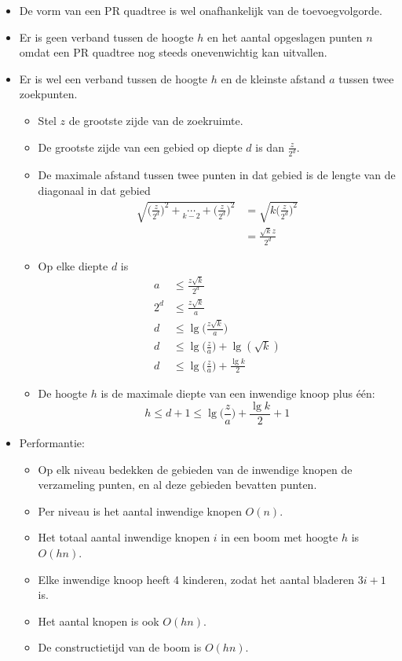 \begin{itemize}
\begin{itemize}
    \end{itemize}
    \item De vorm van een PR quadtree is wel onafhankelijk van de toevoegvolgorde.
    \item Er is geen verband tussen de hoogte $h$ en het aantal opgeslagen punten $n$ omdat een PR quadtree nog steeds onevenwichtig kan uitvallen.
    \item Er is wel een verband tussen de hoogte $h$ en de kleinste afstand $a$ tussen twee zoekpunten.
    \begin{itemize}
        \item Stel $z$ de grootste zijde van de zoekruimte.
        \item De grootste zijde van een gebied op diepte $d$ is dan $\frac{z}{2^d}$. 
        \item De maximale afstand tussen twee punten in dat gebied is de lengte van de diagonaal in dat gebied
        \begin{align*}
            \sqrt{\bigg(\frac{z}{2^d}\bigg)^2 + \underset{k - 2}{\cdots} + \bigg(\frac{z}{2^d}\bigg)^2}  &= \sqrt{k\bigg(\frac{z}{2^d}\bigg)^2} \\
                &= \frac{\sqrt{k}z}{2^d}
        \end{align*} 
        \item Op elke diepte $d$ is 
        \begin{align*}
            a   &\leq \frac{z\sqrt{k}}{2^d} \\
            2^d &\leq \frac{z\sqrt{k}}{a} \\
            d &\leq \lg\bigg(\frac{z\sqrt{k}}{a}\bigg) \\
            d &\leq \lg\bigg(\frac{z}{a}\bigg) + \lg(\sqrt{k})\\
            d &\leq \lg\bigg(\frac{z}{a}\bigg) + \frac{\lg k}{2}
        \end{align*}
        \item De hoogte $h$ is de maximale diepte van een inwendige knoop plus één:
        $$h \leq d + 1\leq  \lg\bigg(\frac{z}{a}\bigg) + \frac{\lg k}{2} + 1$$
    \end{itemize}
    \item Performantie:
    \begin{itemize}
        \item Op elk niveau bedekken de gebieden van de inwendige knopen de verzameling punten, en al deze gebieden bevatten punten.
        \item Per niveau is het aantal inwendige knopen $O(n)$.
        \item Het totaal aantal inwendige knopen $i$ in een boom met hoogte $h$ is $O(hn)$.
        \item Elke inwendige knoop heeft 4 kinderen, zodat het aantal bladeren $3i + 1$ is.
        \item Het aantal knopen is ook $O(hn)$.
        \item De constructietijd van de boom is $O(hn)$.
    \end{itemize}
\end{itemize}

